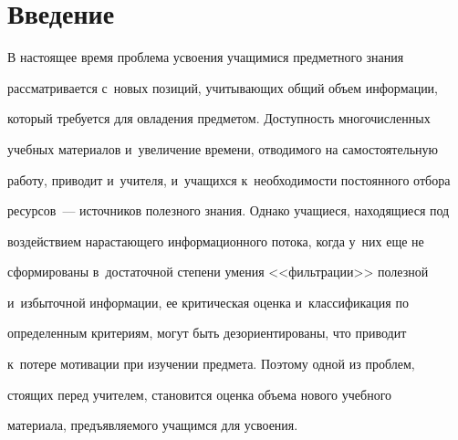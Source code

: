 









 \thispagestyle{headings}


 




  


\section{Введение}










  В настоящее время проблема усвоения учащимися предметного знания 


рас\-смат\-ри\-ва\-ет\-ся с~новых позиций, учи\-ты\-ва\-ющих общий объем информации, 


который требуется для овладения предметом. До\-ступ\-ность многочисленных 


учебных материалов и~увеличение времени, отводимого на самостоятельную 


работу, приводит и~учителя, и~учащихся к~не\-об\-хо\-ди\-мости по\-сто\-ян\-но\-го отбора 


ресурсов~--- источников полезного знания. Однако учащиеся, на\-хо\-дя\-щи\-еся под 


воздействием на\-рас\-та\-юще\-го информационного потока, когда у~них еще не 


сформированы в~достаточной степени умения <<фильтрации>> полезной 


и~избыточной информации, ее критическая оценка и~классификация по 


определенным критериям, могут быть дезориентированы, что приводит 


к~потере мотивации при изучении предмета. Поэтому одной из проб\-лем, 


стоящих перед учителем, становится оценка объема нового учебного 


материала, предъ\-яв\-ля\-емо\-го учащимся для усвоения.



